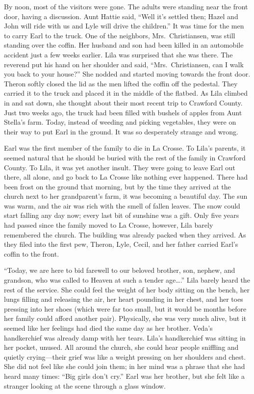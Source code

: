 \documentclass[
  american,
  letterpaper,
]{book}
\begin{document}
By noon, most of the visitors were gone. The adults were standing near
the front door, having a discussion. Aunt Hattie said, ``Well it's
settled then; Hazel and John will ride with us and Lyle will drive the
children.'' It was time for the men to carry Earl to the truck. One of
the neighbors, Mrs.~Christiansen, was still standing over the coffin.
Her husband and son had been killed in an automobile accident just a few
weeks earlier. Lila was surprised that she was there. The reverend put
his hand on her shoulder and said, ``Mrs.~Christiansen, can I walk you
back to your house?'' She nodded and started moving towards the front
door. Theron softly closed the lid as the men lifted the coffin off the
pedestal. They carried it to the truck and placed it in the middle of
the flatbed. As Lila climbed in and sat down, she thought about their
most recent trip to Crawford County. Just two weeks ago, the truck had
been filled with bushels of apples from Aunt Stella's farm. Today,
instead of weeding and picking vegetables, they were on their way to put
Earl in the ground. It was so desperately strange and wrong.

Earl was the first member of the family to die in La Crosse. To Lila's
parents, it seemed natural that he should be buried with the rest of the
family in Crawford County. To Lila, it was yet another insult. They were
going to leave Earl out there, all alone, and go back to La Crosse like
nothing ever happened. There had been frost on the ground that morning,
but by the time they arrived at the church next to her grandparent's
farm, it was becoming a beautiful day. The sun was warm, and the air was
rich with the smell of fallen leaves. The snow could start falling any
day now; every last bit of sunshine was a gift. Only five years had
passed since the family moved to La Crosse, however, Lila barely
remembered the church. The building was already packed when they
arrived. As they filed into the first pew, Theron, Lyle, Cecil, and her
father carried Earl's coffin to the front.

``Today, we are here to bid farewell to our beloved brother, son,
nephew, and grandson, who was called to Heaven at such a tender
age\ldots.'' Lila barely heard the rest of the service. She could feel
the weight of her body sitting on the bench, her lungs filling and
releasing the air, her heart pounding in her chest, and her toes
pressing into her shoes (which were far too small, but it would be
months before her family could afford another pair). Physically, she was
very much alive, but it seemed like her feelings had died the same day
as her brother. Veda's handkerchief was already damp with her tears.
Lila's handkerchief was sitting in her pocket, unused. All around the
church, she could hear people sniffling and quietly crying---their grief
was like a weight pressing on her shoulders and chest. She did not feel
like she could join them; in her mind was a phrase that she had heard
many times: ``Big girls don't cry.'' Earl was her brother, but she felt
like a stranger looking at the scene through a glass window.
\end{document}
